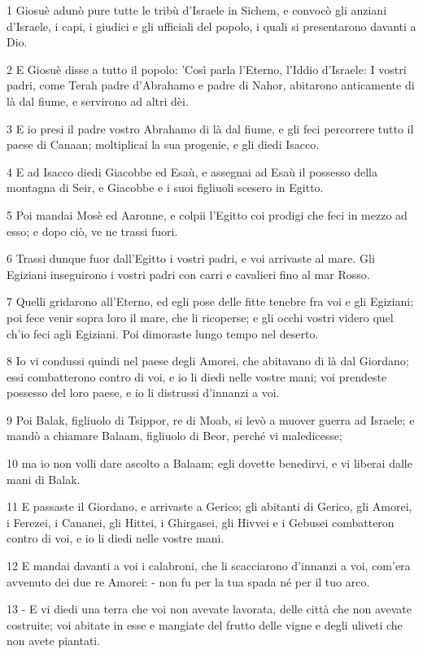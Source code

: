 \par 1 Giosuè adunò pure tutte le tribù d'Israele in Sichem, e convocò gli anziani d'Israele, i capi, i giudici e gli ufficiali del popolo, i quali si presentarono davanti a Dio.
\par 2 E Giosuè disse a tutto il popolo: 'Così parla l'Eterno, l'Iddio d'Israele: I vostri padri, come Terah padre d'Abrahamo e padre di Nahor, abitarono anticamente di là dal fiume, e servirono ad altri dèi.
\par 3 E io presi il padre vostro Abrahamo di là dal fiume, e gli feci percorrere tutto il paese di Canaan; moltiplicai la sua progenie, e gli diedi Isacco.
\par 4 E ad Isacco diedi Giacobbe ed Esaù, e assegnai ad Esaù il possesso della montagna di Seir, e Giacobbe e i suoi figliuoli scesero in Egitto.
\par 5 Poi mandai Mosè ed Aaronne, e colpii l'Egitto coi prodigi che feci in mezzo ad esso; e dopo ciò, ve ne trassi fuori.
\par 6 Trassi dunque fuor dall'Egitto i vostri padri, e voi arrivaste al mare. Gli Egiziani inseguirono i vostri padri con carri e cavalieri fino al mar Rosso.
\par 7 Quelli gridarono all'Eterno, ed egli pose delle fitte tenebre fra voi e gli Egiziani; poi fece venir sopra loro il mare, che li ricoperse; e gli occhi vostri videro quel ch'io feci agli Egiziani. Poi dimoraste lungo tempo nel deserto.
\par 8 Io vi condussi quindi nel paese degli Amorei, che abitavano di là dal Giordano; essi combatterono contro di voi, e io li diedi nelle vostre mani; voi prendeste possesso del loro paese, e io li distrussi d'innanzi a voi.
\par 9 Poi Balak, figliuolo di Tsippor, re di Moab, si levò a muover guerra ad Israele; e mandò a chiamare Balaam, figliuolo di Beor, perché vi maledicesse;
\par 10 ma io non volli dare ascolto a Balaam; egli dovette benedirvi, e vi liberai dalle mani di Balak.
\par 11 E passaste il Giordano, e arrivaste a Gerico; gli abitanti di Gerico, gli Amorei, i Ferezei, i Cananei, gli Hittei, i Ghirgasei, gli Hivvei e i Gebusei combatteron contro di voi, e io li diedi nelle vostre mani.
\par 12 E mandai davanti a voi i calabroni, che li scacciarono d'innanzi a voi, com'era avvenuto dei due re Amorei: - non fu per la tua spada né per il tuo arco.
\par 13 - E vi diedi una terra che voi non avevate lavorata, delle città che non avevate costruite; voi abitate in esse e mangiate del frutto delle vigne e degli uliveti che non avete piantati.

